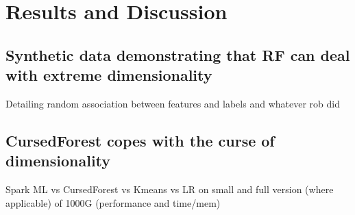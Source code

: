 \documentclass[10pt,letterpaper]{article}
\begin{document}

\section*{Results and Discussion}




\subsection*{Synthetic data demonstrating that RF can deal with extreme dimensionality}
Detailing random association between features and labels
and whatever rob did


\subsection*{CursedForest copes with the curse of dimensionality}
\label{comp}
Spark ML vs CursedForest vs Kmeans vs LR on small and full version (where applicable) of 1000G (performance and time/mem)
\end{document}
